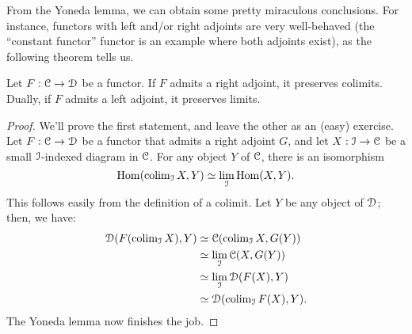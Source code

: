 From the Yoneda lemma, we can obtain some pretty miraculous conclusions.
For instance, functors with left and/or right adjoints are very well-behaved
(the ``constant functor'' functor is an example where both adjoints exist),
as the following theorem tells us.
\begin{theorem}\label{adjointslimits}
    Let $F:\mathcal C\to\mathcal D$ be a functor.
    If $F$ admits a right adjoint, it preserves colimits.
    Dually, if $F$ admits a left adjoint, it preserves limits.
\end{theorem}
\begin{proof}
    We'll prove the first statement, and leave the other as an (easy) exercise.
    Let $F:\mathcal C\to\mathcal D$ be a functor that admits a right adjoint $G$, and let $X:\mathcal I\to\mathcal C$ be a
    small $\mathcal I$-indexed diagram in $\mathcal C$.
    For any object $Y$ of $\mathcal C$, there is an isomorphism
    $$\operatorname{Hom}(\operatorname{colim}_{\mathcal I} X, Y) \simeq \lim_{\mathcal I}\operatorname{Hom}(X, Y).$$
    This follows easily from the definition of a colimit.
    Let $Y$ be any object of $\mathcal D$; then, we have:
    \begin{align*}
	\mathcal D(F(\operatorname{colim}_{\mathcal I} X), Y) & \simeq \mathcal C(\operatorname{colim}_{\mathcal I} X, G(Y))\\
	& \simeq \lim_{\mathcal I}\mathcal C(X, G(Y))\\
	& \simeq \lim_{\mathcal I}\mathcal D(F(X), Y)\\
	& \simeq \mathcal D(\operatorname{colim}_{\mathcal I}F(X), Y).
    \end{align*}
    The Yoneda lemma now finishes the job.
\end{proof}
